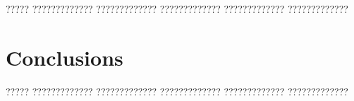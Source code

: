 \documentclass[11pt,spanish,listoffigures,listoftables]{tfgetsinf}
\begin{document}
????? ????????????? ????????????? ????????????? ????????????? ?????????????


\chapter{Conclusions}

????? ????????????? ????????????? ????????????? ????????????? ????????????? 

\end{document}

